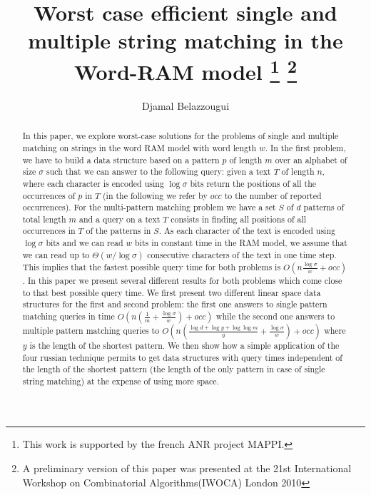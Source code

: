 \documentclass{article}
\newcommand{\?}{\mskip1.5mu}
\begin{document}
 
\title{Worst case efficient single and multiple string matching in the Word-RAM model
\thanks{This work is supported by the french ANR project MAPPI.}
\thanks{A preliminary version of this paper was presented at the 21st International Workshop on Combinatorial Algorithms(IWOCA)  London 2010}
}   

\author{Djamal Belazzougui}

\maketitle
\begin{abstract}


In this paper, we explore worst-case solutions for the problems of single and multiple matching on strings in the word RAM model with word length $w$. 
In the first problem, we have to build a data structure based on a pattern $p$ of length $m$ over an alphabet of size $\sigma$ such that we can answer to the following query: given a text $T$ of length $n$, where each character is encoded using $\log\sigma$ bits return the positions of all the occurrences of $p$ in $T$ (in the following we refer by $occ$ to the number of reported occurrences). For the multi-pattern matching problem we have a set $S$ of $d$ patterns of total length $m$ and a query on a text $T$ consists in finding all positions of all occurrences in $T$ of the patterns in $S$. As each character of the text is encoded using $\log\sigma$ bits and we can read $w$ bits in constant time in the RAM model, we assume that we can read up to $\Theta(w/\log\sigma)$ consecutive characters of the text in one time step. This implies that the fastest possible query time for both problems is $O(n\frac{\log\sigma}{w}+occ)$. In this paper we present several different results for both problems which come close to that best possible query time. 
We first present two different linear space data structures for the first and second problem: the first one answers to single pattern matching queries in time $O(n(\frac{1}{m}+\frac{\log\sigma}{w})+occ)$ while the second one answers to multiple pattern matching queries to $O(n(\frac{\log d+\log y+\log\log m}{y}+\frac{\log \sigma}{w})+occ)$ where $y$ is the length of the shortest pattern. We then show how a simple application of the four russian technique permits to get data structures with query times independent of the length of the shortest pattern (the length of the only pattern in case of single string matching) at the expense of using more space.



\end{abstract}
\end{document}
